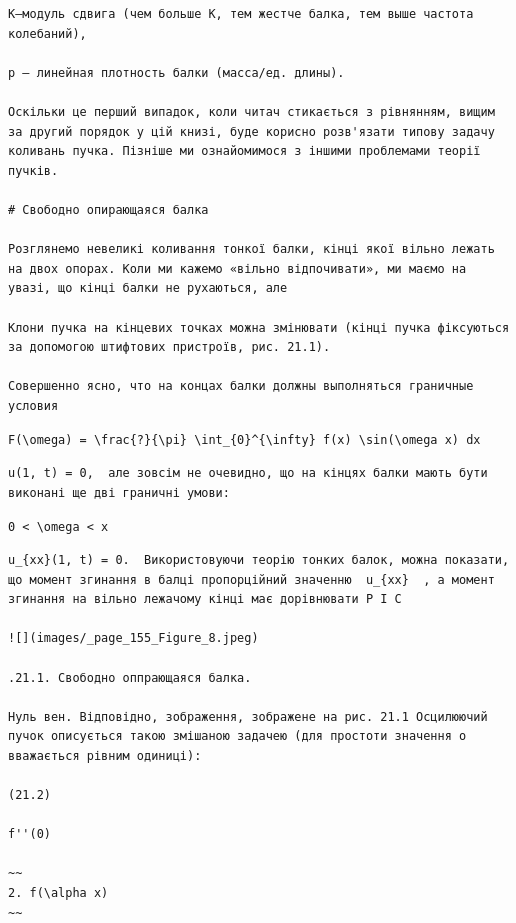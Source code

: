 \documentclass[
  ukrainian,
]{article}
\begin{document}
\begin{verbatim}
K—модуль сдвига (чем больше K, тем жестче балка, тем выше частота колебаний),

р — линейная плотность балки (масса/ед. длины).

Оскільки це перший випадок, коли читач стикається з рівнянням, вищим за другий порядок у цій книзі, буде корисно розв'язати типову задачу коливань пучка. Пізніше ми ознайомимося з іншими проблемами теорії пучків.

# Свободно опирающаяся балка

Розглянемо невеликі коливання тонкої балки, кінці якої вільно лежать на двох опорах. Коли ми кажемо «вільно відпочивати», ми маємо на увазі, що кінці балки не рухаються, але

Клони пучка на кінцевих точках можна змінювати (кінці пучка фіксуються за допомогою штифтових пристроїв, рис. 21.1).

Совершенно ясно, что на концах балки должны выполняться граничные условия
\end{verbatim}

\texttt{F(\textbackslash{}omega)\ =\ \textbackslash{}frac\{?\}\{\textbackslash{}pi\}\ \textbackslash{}int\_\{0\}\^{}\{\textbackslash{}infty\}\ f(x)\ \textbackslash{}sin(\textbackslash{}omega\ x)\ dx}

\begin{verbatim}
u(1, t) = 0,  але зовсім не очевидно, що на кінцях балки мають бути виконані ще дві граничні умови:
\end{verbatim}

\texttt{0\ \textless{}\ \textbackslash{}omega\ \textless{}\ x}

\begin{verbatim}
u_{xx}(1, t) = 0.  Використовуючи теорію тонких балок, можна показати, що момент згинання в балці пропорційний значенню  u_{xx}  , а момент згинання на вільно лежачому кінці має дорівнювати P I C

![](images/_page_155_Figure_8.jpeg)

.21.1. Свободно оппрающаяся балка.

Нуль вен. Відповідно, зображення, зображене на рис. 21.1 Осцилюючий пучок описується такою змішаною задачею (для простоти значення o вважається рівним одиниці):

(21.2)

f''(0)

~~
2. f(\alpha x)
~~
\end{verbatim}
\end{document}
